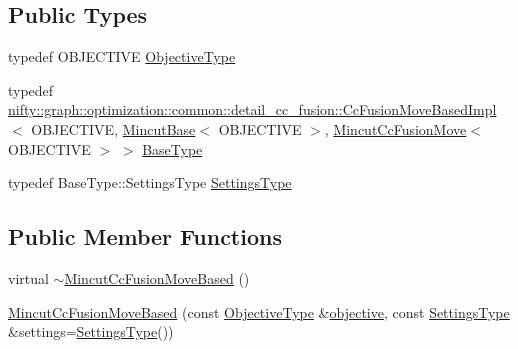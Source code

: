 \subsection*{Public Types}
\begin{DoxyCompactItemize}
\item 
typedef O\+B\+J\+E\+C\+T\+I\+V\+E \hyperlink{classnifty_1_1graph_1_1optimization_1_1mincut_1_1MincutCcFusionMoveBased_ae0864738d958dbac830a2b2c438e1f9c}{Objective\+Type}
\item 
typedef \hyperlink{classnifty_1_1graph_1_1optimization_1_1common_1_1detail__cc__fusion_1_1CcFusionMoveBasedImpl}{nifty\+::graph\+::optimization\+::common\+::detail\+\_\+cc\+\_\+fusion\+::\+Cc\+Fusion\+Move\+Based\+Impl}$<$ O\+B\+J\+E\+C\+T\+I\+V\+E, \hyperlink{classnifty_1_1graph_1_1optimization_1_1mincut_1_1MincutBase}{Mincut\+Base}$<$ O\+B\+J\+E\+C\+T\+I\+V\+E $>$, \hyperlink{classnifty_1_1graph_1_1optimization_1_1mincut_1_1MincutCcFusionMove}{Mincut\+Cc\+Fusion\+Move}$<$ O\+B\+J\+E\+C\+T\+I\+V\+E $>$ $>$ \hyperlink{classnifty_1_1graph_1_1optimization_1_1mincut_1_1MincutCcFusionMoveBased_a31d3d7f7856e3ebb546692dbb9466060}{Base\+Type}
\item 
typedef Base\+Type\+::\+Settings\+Type \hyperlink{classnifty_1_1graph_1_1optimization_1_1mincut_1_1MincutCcFusionMoveBased_a2386e84171c650a3e18f8bdfd005c15c}{Settings\+Type}
\end{DoxyCompactItemize}
\subsection*{Public Member Functions}
\begin{DoxyCompactItemize}
\item 
virtual \hyperlink{classnifty_1_1graph_1_1optimization_1_1mincut_1_1MincutCcFusionMoveBased_ac7d205ab105f7d26ea1a0dec0d93a5f3}{$\sim$\+Mincut\+Cc\+Fusion\+Move\+Based} ()
\item 
\hyperlink{classnifty_1_1graph_1_1optimization_1_1mincut_1_1MincutCcFusionMoveBased_a988f011488b273c5fdc53e63ad19c4de}{Mincut\+Cc\+Fusion\+Move\+Based} (const \hyperlink{classnifty_1_1graph_1_1optimization_1_1mincut_1_1MincutCcFusionMoveBased_ae0864738d958dbac830a2b2c438e1f9c}{Objective\+Type} \&\hyperlink{classnifty_1_1graph_1_1optimization_1_1common_1_1detail__cc__fusion_1_1CcFusionMoveBasedImpl_ad97005b4bf8bd030c06759e90ca8bbd3}{objective}, const \hyperlink{classnifty_1_1graph_1_1optimization_1_1mincut_1_1MincutCcFusionMoveBased_a2386e84171c650a3e18f8bdfd005c15c}{Settings\+Type} \&settings=\hyperlink{classnifty_1_1graph_1_1optimization_1_1mincut_1_1MincutCcFusionMoveBased_a2386e84171c650a3e18f8bdfd005c15c}{Settings\+Type}())
\end{DoxyCompactItemize}


